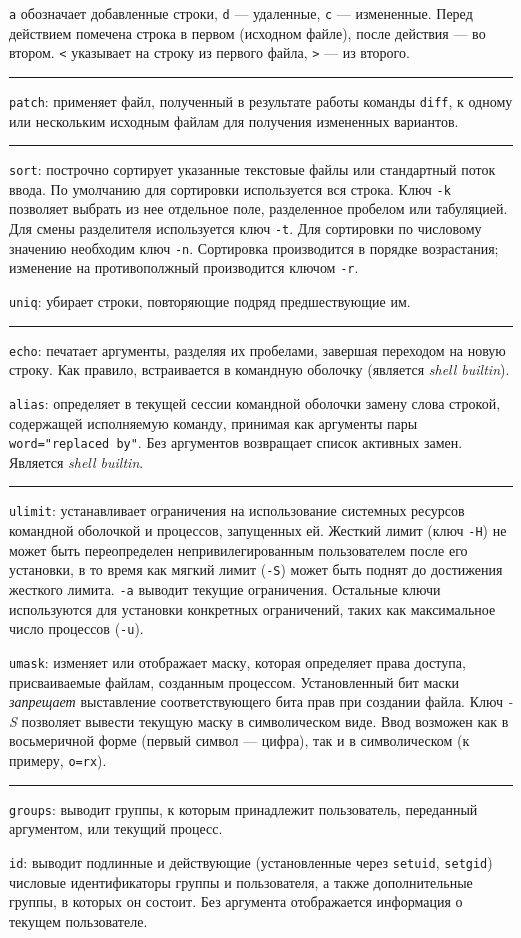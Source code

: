 \documentclass[listings]{labreport}
\begin{document}
\texttt{a} обозначает добавленные строки, \texttt{d} — удаленные, \texttt{c} —
измененные. Перед действием помечена строка в первом (исходном файле),
после действия — во втором. \texttt{<} указывает на строку из первого файла,
\texttt{>} — из второго.

\noindent\rule{\textwidth}{1pt}

\texttt{patch}: применяет файл, полученный в результате работы команды \texttt{diff},
к одному или нескольким исходным файлам для получения измененных вариантов.

\noindent\rule{\textwidth}{1pt}

\texttt{sort}: построчно сортирует указанные текстовые файлы или стандартный поток ввода.
По умолчанию для сортировки используется вся строка. Ключ \texttt{-k} позволяет
выбрать из нее отдельное поле, разделенное пробелом или табуляцией. Для смены разделителя
используется ключ \texttt{-t}. Для сортировки по числовому значению необходим ключ \texttt{-n}.
Сортировка производится в порядке возрастания; изменение на противополжный производится ключом \texttt{-r}.

\texttt{uniq}: убирает строки, повторяющие подряд предшествующие им.

\noindent\rule{\textwidth}{1pt}

\texttt{echo}: печатает аргументы, разделяя их пробелами, завершая переходом на новую строку. Как
правило, встраивается в командную оболочку (является \textit{shell builtin}).

\texttt{alias}: определяет в текущей сессии командной оболочки замену слова строкой, содержащей
исполняемую команду, принимая как аргументы пары \texttt{word="replaced by"}. Без аргументов
возвращает список активных замен. Является \textit{shell builtin}.

\noindent\rule{\textwidth}{1pt}

\texttt{ulimit}: устанавливает ограничения на использование системных ресурсов командной оболочкой
и процессов, запущенных ей. Жесткий лимит (ключ \texttt{-H}) не может быть переопределен
непривилегированным пользователем после его установки, в то время как мягкий лимит (\texttt{-S})
может быть поднят до достижения жесткого лимита. \texttt{-a} выводит текущие ограничения.
Остальные ключи используются для установки конкретных ограничений, таких как максимальное
число процессов (\texttt{-u}).

\texttt{umask}: изменяет или отображает маску, которая определяет права доступа, присваиваемые файлам,
созданным процессом. Установленный бит маски \textit{запрещает} выставление соответствующего бита прав
при создании файла. Ключ \textit{-S} позволяет вывести текущую маску в символическом виде. Ввод
возможен как в восьмеричной форме (первый символ — цифра), так и в символическом (к примеру, \texttt{o=rx}).

\noindent\rule{\textwidth}{1pt}

\texttt{groups}: выводит группы, к которым принадлежит пользователь, переданный аргументом, или текущий процесс.

\texttt{id}: выводит подлинные и действующие (установленные через \texttt{setuid}, \texttt{setgid})
числовые идентификаторы группы и пользователя, а также дополнительные группы, в которых он состоит.
Без аргумента отображается информация о текущем пользователе.
\end{document}
